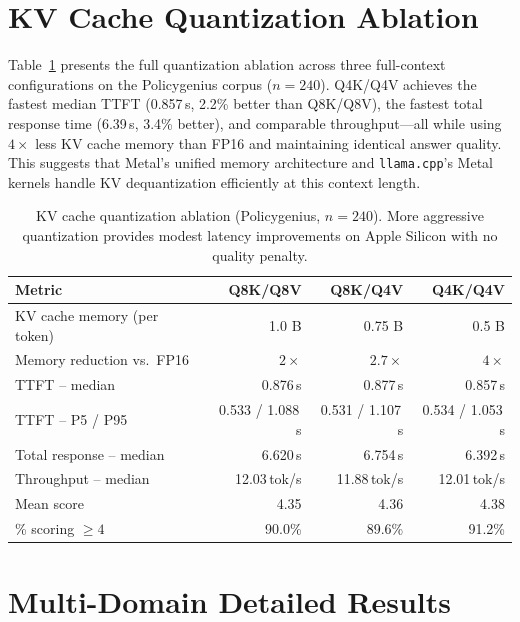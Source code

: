 \documentclass{article}
\begin{document}
\section{KV Cache Quantization Ablation}
\label{app:kvquant}

Table~\ref{tab:kvquant} presents the full quantization ablation across three
full-context configurations on the Policygenius corpus ($n=240$).
Q4K/Q4V achieves the fastest median TTFT
(0.857\,s, 2.2\% better than Q8K/Q8V), the fastest total response time
(6.39\,s, 3.4\% better), and comparable throughput---all while using
$4\times$ less KV cache memory than FP16 and maintaining identical answer
quality. This suggests that Metal's unified memory architecture and
\texttt{llama.cpp}'s Metal kernels handle KV dequantization efficiently at
this context length.

\begin{table}[t]
\centering
\caption{KV cache quantization ablation (Policygenius, $n=240$). More aggressive quantization provides
modest latency improvements on Apple Silicon with no quality penalty.}
\label{tab:kvquant}
\begin{tabular}{lrrr}
\toprule
\textbf{Metric} & \textbf{Q8K/Q8V} & \textbf{Q8K/Q4V} & \textbf{Q4K/Q4V} \\
\midrule
KV cache memory (per token)   & 1.0 B & 0.75 B & 0.5 B \\
Memory reduction vs.\ FP16   & $2\times$ & $2.7\times$ & $4\times$ \\
\midrule
TTFT -- median                & 0.876\,s & 0.877\,s & 0.857\,s \\
TTFT -- P5 / P95              & 0.533 / 1.088\,s & 0.531 / 1.107\,s & 0.534 / 1.053\,s \\
Total response -- median      & 6.620\,s & 6.754\,s & 6.392\,s \\
Throughput -- median          & 12.03\,tok/s & 11.88\,tok/s & 12.01\,tok/s \\
\midrule
Mean score                    & 4.35 & 4.36 & 4.38 \\
\% scoring $\geq 4$          & 90.0\% & 89.6\% & 91.2\% \\
\bottomrule
\end{tabular}
\end{table}

\section{Multi-Domain Detailed Results}
\label{app:multidomain}
\end{document}
